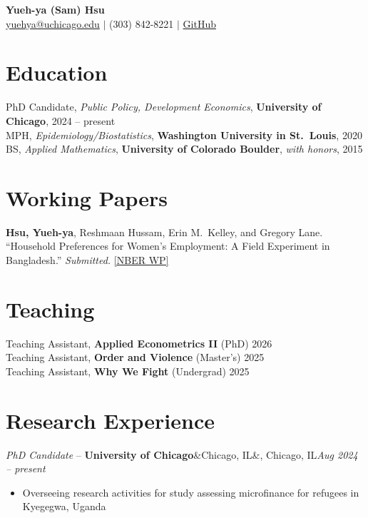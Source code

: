 \documentclass[11pt, letterpaper]{article}
\newcommand{\entry}[4]{%
  \noindent\textit{#1} -- \textbf{#2}\ifx&#3&\else, #3\fi \hfill \textit{#4}\\[2pt]
}
\newcommand{\edline}[3]{%
  \noindent #1, \textbf{#2}, #3\\[3pt]
}
\begin{document}
\begin{center}
  {\LARGE\bfseries Yueh-ya (Sam) Hsu}\\[6pt]
  \href{mailto:yuehya@uchicago.edu}{yuehya@uchicago.edu}
  \quad $\vert$ \quad (303) 842-8221
  \quad $\vert$ \quad \href{https://github.com/yuehyahsu}{GitHub}
\end{center}

\vspace{-4pt}

\section{Education}

\edline{PhD Candidate, \textit{Public Policy, Development Economics}}{University of Chicago}{2024 -- present}
\edline{MPH, \textit{Epidemiology/Biostatistics}}{Washington University in St.\ Louis}{2020}
\edline{BS, \textit{Applied Mathematics}}{University of Colorado Boulder}{\textit{with honors}, 2015}

\section{Working Papers}

\noindent \textbf{Hsu, Yueh-ya}, Reshmaan Hussam, Erin M.\ Kelley, and Gregory Lane.
``Household Preferences for Women's Employment: A Field Experiment in Bangladesh.''
\textit{Submitted.}
\href{https://www.nber.org/papers/w34969}{[NBER WP]}

\section{Teaching}

\noindent Teaching Assistant, \textbf{Applied Econometrics II} (PhD) \hfill 2026\\[2pt]
\noindent Teaching Assistant, \textbf{Order and Violence} (Master's) \hfill 2025\\[2pt]
\noindent Teaching Assistant, \textbf{Why We Fight} (Undergrad) \hfill 2025

\section{Research Experience}

\entry{PhD Candidate}{University of Chicago}{Chicago, IL}{Aug 2024 -- present}
\begin{itemize}
  \item Overseeing research activities for study assessing microfinance for refugees in Kyegegwa, Uganda
\end{itemize}
\end{document}
